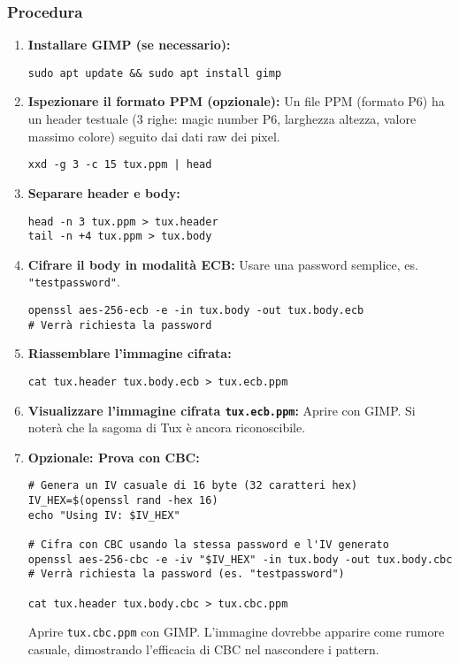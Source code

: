 \subsubsection{Procedura}
\begin{enumerate}
    \item \textbf{Installare GIMP (se necessario):}
    \begin{verbatim}
sudo apt update && sudo apt install gimp
    \end{verbatim}
    \item \textbf{Ispezionare il formato PPM (opzionale):}
    Un file PPM (formato P6) ha un header testuale (3 righe: magic number P6, larghezza altezza, valore massimo colore) seguito dai dati raw dei pixel.
    \begin{verbatim}
xxd -g 3 -c 15 tux.ppm | head
    \end{verbatim}
    \item \textbf{Separare header e body:}
    \begin{verbatim}
head -n 3 tux.ppm > tux.header
tail -n +4 tux.ppm > tux.body
    \end{verbatim}
    \item \textbf{Cifrare il body in modalità ECB:}
    Usare una password semplice, es. \texttt{"testpassword"}.
    \begin{verbatim}
openssl aes-256-ecb -e -in tux.body -out tux.body.ecb
# Verrà richiesta la password
    \end{verbatim}
    \item \textbf{Riassemblare l'immagine cifrata:}
    \begin{verbatim}
cat tux.header tux.body.ecb > tux.ecb.ppm
    \end{verbatim}
    \item \textbf{Visualizzare l'immagine cifrata \texttt{tux.ecb.ppm}:}
    Aprire con GIMP. Si noterà che la sagoma di Tux è ancora riconoscibile.
    \item \textbf{Opzionale: Prova con CBC:}
    \begin{verbatim}
# Genera un IV casuale di 16 byte (32 caratteri hex)
IV_HEX=$(openssl rand -hex 16)
echo "Using IV: $IV_HEX"

# Cifra con CBC usando la stessa password e l'IV generato
openssl aes-256-cbc -e -iv "$IV_HEX" -in tux.body -out tux.body.cbc
# Verrà richiesta la password (es. "testpassword")

cat tux.header tux.body.cbc > tux.cbc.ppm
    \end{verbatim}
    Aprire \texttt{tux.cbc.ppm} con GIMP. L'immagine dovrebbe apparire come rumore casuale, dimostrando l'efficacia di CBC nel nascondere i pattern.
\end{enumerate}

